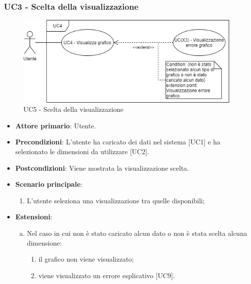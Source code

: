 \subsubsection{UC3 - Scelta della visualizzazione}
\begin{figure}[h]
\includegraphics[width=\linewidth]{section/Images/UC5SceltaVisualizzazione.png}
\centering
\caption{UC5 - Scelta della visualizzazione}
\end{figure}
\begin{itemize}
	\item \textbf{Attore primario}: Utente.
	\item \textbf{Precondizioni}: L'utente ha caricato dei dati nel sistema [UC1] e ha selezionato le dimensioni da utilizzare [UC2].
	\item \textbf{Postcondizioni}: Viene mostrata la visualizzazione scelta.
	\item \textbf{Scenario principale}:
		\begin{enumerate}
			\item L'utente seleziona una visualizzazione tra quelle disponibili;
		\end{enumerate}
	\item \textbf{Estensioni}:
	\begin{enumerate}[(a)]
		\item Nel caso in cui non è stato caricato alcun dato o non è stata scelta alcuna dimensione:
		\begin{enumerate}[1.]
			\item il grafico non viene visualizzato;
			\item viene visualizzato un errore esplicativo [UC9].
		\end{enumerate}
	\end{enumerate}
\end{itemize}